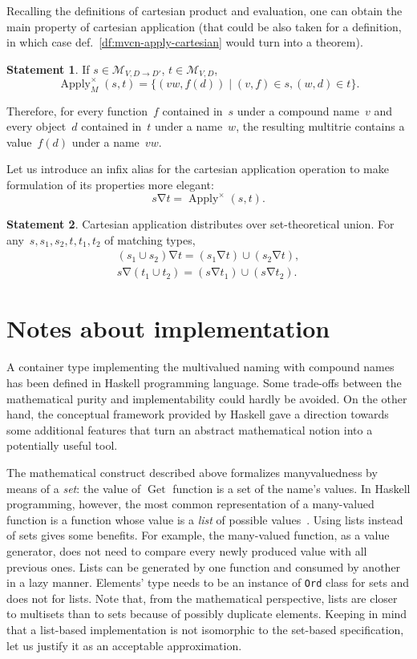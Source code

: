 \documentclass{article}
\theoremstyle{definition}
\newtheorem{St}{Statement}
\newcommand{\setcharmvcn}{M}
\newcommand{\setsymbol}[3]{\mathcal{#1}_{#2,#3}}
\newcommand{\setmvcn}[2]{\setsymbol{\setcharmvcn}{#1}{#2}}
\newcommand{\deref}{\operatorname{Get}}
\newcommand{\apply}{\operatorname{Apply}}
\newcommand{\inapply}{\mathbin{\nabla}}
\begin{document}
Recalling the definitions of cartesian product and evaluation, one can
obtain the main property of cartesian application (that could be also taken
for a definition, in which case def.~\ref{df:mvcn-apply-cartesian} would turn
into a theorem).
 
\begin{St}\label{st:mvcn-apply-cartesian}
If $s\in \setmvcn{V}{D\to D'}$, $t\in \setmvcn{V}{D}$,
\[
  \apply_{\setcharmvcn}^{\times} (s, t) =
    \{ (vw, f(d)) \mid (v,f) \in s, (w,d) \in t \} .
\]
\end{St}

Therefore, for every function~$f$ contained in~$s$ under a compound name~$v$
and every object~$d$ contained in~$t$ under a name~$w$, the resulting
multitrie contains a value~$f(d)$ under a name~$vw$.

Let us introduce an infix alias for the cartesian application operation to make
formulation of its properties more elegant:
\[
  s \inapply t = \apply^{\times} (s, t) .
\]

\begin{St}\label{st:apply-distr}
Cartesian application distributes over set-theoretical union.
For any~$s, s_1, s_2, t, t_1, t_2$ of matching types,
\begin{eqnarray*}
  (s_1 \cup s_2) \inapply t = (s_1 \inapply t) \cup (s_2 \inapply t) , \\
  s \inapply (t_1 \cup t_2) = (s \inapply t_1) \cup (s \inapply t_2) .
\end{eqnarray*}
\end{St}


\section{Notes about implementation}

A container type implementing the multivalued naming with compound names has
been defined in Haskell programming language. Some trade-offs between the
mathematical purity and implementability could hardly be avoided. On the other
hand, the conceptual framework provided by Haskell gave a
direction towards some additional features that turn an abstract mathematical
notion into a potentially useful tool.

The mathematical construct described above formalizes manyvaluedness by means
of a \emph{set}: the value of $\deref$ function is a set of the name's values.
In Haskell programming, however, the most common representation of a many-valued
function is a function whose value is a \emph{list} of possible
values~\cite[p.~285]{bib:lipovaca}.  Using lists instead of sets gives some
benefits. For example, the many-valued function, as a value generator, does not
need to compare every newly produced value with all previous ones. Lists can be
generated by one function and consumed by another in a lazy manner. Elements'
type needs to be an instance of \lstinline{Ord} class for sets and does not for
lists.  Note that,  from the
mathematical perspective, lists are closer to multisets than to sets because of
possibly duplicate elements.  Keeping in mind that a list-based implementation
is not isomorphic to the set-based specification, let us justify it as an
acceptable approximation.
\end{document}
